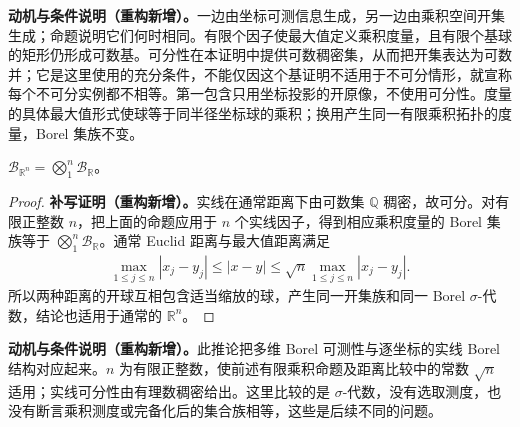\documentclass[../../main.tex]{subfiles}%
\begin{document}
\begin{remark}
\textbf{动机与条件说明（重构新增）。}一边由坐标可测信息生成，另一边由乘积空间开集生成；命题说明它们何时相同。有限个因子使最大值定义乘积度量，且有限个基球的矩形仍形成可数基。可分性在本证明中提供可数稠密集，从而把开集表达为可数并；它是这里使用的充分条件，不能仅因这个基证明不适用于不可分情形，就宣称每个不可分实例都不相等。第一包含只用坐标投影的开原像，不使用可分性。度量的具体最大值形式使球等于同半径坐标球的乘积；换用产生同一有限乘积拓扑的度量，Borel 集族不变。
\end{remark}


\begin{corollary}\label{corollary:ch01-euclidean-product-borel}
$\mathscr{B}_{\mathbb{R}^n}=\bigotimes_1^n\mathscr{B}_{\mathbb{R}}$。
\end{corollary}
\begin{proof}
\textbf{补写证明（重构新增）。}实线在通常距离下由可数集 $\mathbb{Q}$ 稠密，故可分。对有限正整数 $n$，把上面的命题应用于 $n$ 个实线因子，得到相应乘积度量的 Borel 集族等于 $\bigotimes_1^n\mathscr{B}_{\mathbb{R}}$。通常 Euclid 距离与最大值距离满足
\begin{align*}
\max_{1\leqslant j\leqslant n}|x_j-y_j|
\leqslant |x-y|
\leqslant \sqrt{n}\max_{1\leqslant j\leqslant n}|x_j-y_j|.
\end{align*}
所以两种距离的开球互相包含适当缩放的球，产生同一开集族和同一 Borel $\sigma$-代数，结论也适用于通常的 $\mathbb{R}^n$。
\end{proof}
\begin{remark}
\textbf{动机与条件说明（重构新增）。}此推论把多维 Borel 可测性与逐坐标的实线 Borel 结构对应起来。$n$ 为有限正整数，使前述有限乘积命题及距离比较中的常数 $\sqrt n$ 适用；实线可分性由有理数稠密给出。这里比较的是 $\sigma$-代数，没有选取测度，也没有断言乘积测度或完备化后的集合族相等，这些是后续不同的问题。
\end{remark}
\end{document}
